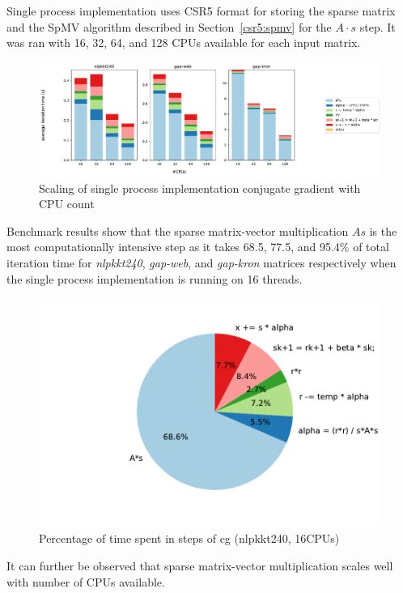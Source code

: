 \documentclass[thesis=M,english]{FITthesis}[2019/12/23]
\begin{document}
Single process implementation uses CSR5 format for storing the sparse matrix and the
SpMV algorithm  described in Section~\ref{csr5:spmv} for the \(A \cdot s\) step. It was ran
with 16, 32, 64, and 128 CPUs available for each input matrix.

\begin{figure}[htp]
    \centering
    \includegraphics[scale=0.35]{static/single_process.pdf}
    \caption{Scaling of single process implementation conjugate gradient with CPU count}
\end{figure}

Benchmark results show that the sparse matrix-vector multiplication
\(As\) is the most computationally intensive step as it takes 68.5, 77.5, and 95.4\% of
total iteration time for \textit{nlpkkt240}, \textit{gap-web}, and \textit{gap-kron} 
matrices respectively when the single process implementation is running on 16 threads.


\begin{figure}[htp]
    \centering
    \includegraphics[scale=0.6]{static/cg_sp_nlpkkt240_16.pdf}
    \caption{Percentage of time spent in steps of cg (nlpkkt240, 16CPUs)}
\end{figure}


It can further be observed that sparse matrix-vector multiplication scales well with
number of CPUs available.
\end{document}
